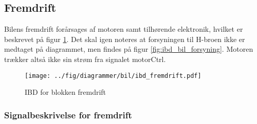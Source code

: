 \subsection{Fremdrift}

Bilens fremdrift forårsages af motoren samt tilhørende elektronik, hvilket er beskrevet på figur \ref{fig:ibd_fremdrift}. Det skal igen noteres at forsyningen til H-broen ikke er medtaget på diagrammet, men findes på figur \ref{fig:ibd_bil_forsyning}. Motoren trækker altså ikke sin strøm fra signalet motorCtrl. 

\begin{figure}[h]
\centering
\texttt{[image: ../fig/diagrammer/bil/ibd\_fremdrift.pdf]}
\caption{IBD for blokken fremdrift}
\label{fig:ibd_fremdrift}
\end{figure}

\clearpage

\subsubsection{Signalbeskrivelse for fremdrift}

